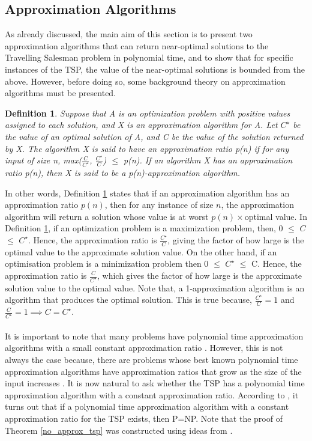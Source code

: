 \documentclass[12pt]{article}
\newtheorem{definition}{Definition}[subsection]
\numberwithin{equation}{subsection}
\numberwithin{table}{subsection}
\numberwithin{algorithm}{subsection}
\numberwithin{figure}{subsection}
\begin{document}
\subsection{Approximation Algorithms}
\label{approx_section}
As already discussed, the main aim of this section is to present two approximation algorithms that can return near-optimal solutions to the Travelling Salesman problem in polynomial time, and to show that for specific instances of the TSP, the value of the near-optimal solutions is bounded from the above. However, before doing so, some background theory on approximation algorithms must be presented.
\begin{definition}
\label{p(n)-approximation algorithm}
Suppose that A is an optimization problem with positive values assigned to each solution, and X is an approximation algorithm for A. Let $C^\star$ be the value of an optimal solution of A, and C be the value of the solution returned by X. The algorithm X is said to have an approximation ratio p(n) if for any input of size n, max($\frac{C}{C^\star}$, $\frac{C^\star}{C}$) $\leq$ p(n). If an algorithm X has an approximation ratio p(n), then X is said to be a p(n)-approximation algorithm. {}
\end{definition}
In other words, Definition \ref{p(n)-approximation algorithm} states that if an approximation algorithm has an approximation ratio $p(n)$, then for any instance of size $n$, the approximation algorithm will return a solution whose value is at worst $p(n)\times$optimal value. In Definition \ref{p(n)-approximation algorithm}, if an optimization problem is a maximization problem, then, 0 $\le$ $C$ $\leq$ $C^\star$. Hence, the approximation ratio is $\frac{C^\star}{C}$, giving the factor of how large is the optimal value to the approximate solution value. On the other hand, if an optimisation problem is a minimization problem then 0 $\le$ $C^\star$ $\leq$ C. Hence, the approximation ratio is $\frac{C}{C^\star}$, which gives the factor of how large is the approximate solution value to the optimal value. Note that, a 1-approximation algorithm is an algorithm that produces the optimal solution. This is true because, $\frac{C^\star}{C} = 1$ and $\frac{C}{C^\star} = 1 \implies C = C^\star$. \cite{cormen_leiserson_rivest_stein}
\\\\
It is important to note that many problems have polynomial time approximation algorithms with a small constant approximation ratio \cite{cormen_leiserson_rivest_stein}. However, this is not always the case because, there are problems whose best known polynomial time approximation algorithms have approximation ratios that grow as the size of the input increases \cite{cormen_leiserson_rivest_stein}. It is now natural to ask whether the TSP has a polynomial time approximation algorithm with a constant approximation ratio. According to \cite{cormen_leiserson_rivest_stein}, it turns out that if a polynomial time approximation algorithm with a constant approximation ratio for the TSP exists, then P=NP. Note that the proof of Theorem \ref{no_approx_tsp} was constructed using ideas from \cite{cormen_leiserson_rivest_stein}.
\end{document}
